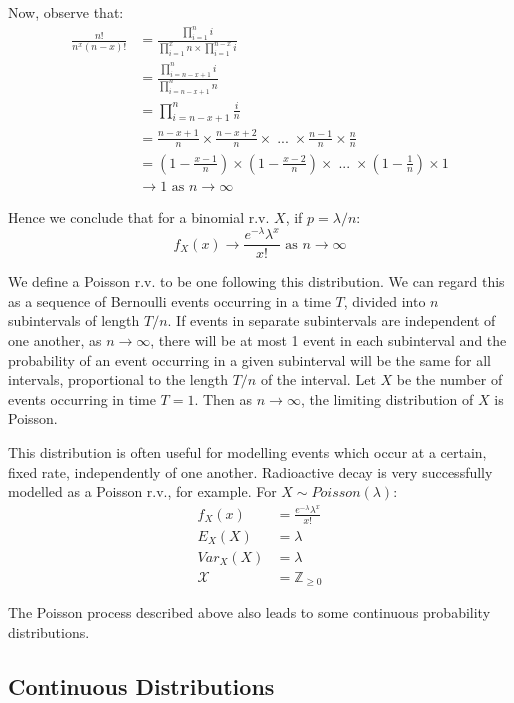 \documentclass[12pt,a4paper]{article}
\begin{document}
Now, observe that:
\begin{align*}
\frac{n!}{n^x(n-x)!} &= \frac{\prod\limits_{i=1}^n\!\! i}{\prod\limits_{i=1}^x\!\! n \times \prod\limits_{i=1}^{n-x} \!\!i}\\
&= \frac{\prod\limits_{i=n-x+1}^n\!\! i}{\prod\limits_{i=n-x+1}^n \!\!n}\\
&= \prod\limits_{i=n-x+1}^n \!\!\frac{i}{n}\\
&= \frac{n-x+1}{n}\times\frac{n-x+2}{n}\times\; ... \; \times \frac{n-1}{n} \times \frac{n}{n}\\
&= \left(1 - \frac{x-1}{n}\right) \times \left(1 - \frac{x-2}{n}\right)\times \; ...\; \times \left(1 - \frac{1}{n}\right) \times 1\\
&\rightarrow 1 \text{ as } n \rightarrow \infty
\end{align*}

Hence we conclude that for a binomial r.v. $X$, if $p = \lambda/n$:
$$f_X(x) \rightarrow \frac{e^{-\lambda}\lambda^x}{x!} \text{ as } n \rightarrow \infty$$

We define a Poisson r.v. to be one following this distribution. We can regard this as a sequence of Bernoulli events occurring in a time $T$, divided into $n$ subintervals of length $T/n$. If events in separate subintervals are independent of one another, as $n \rightarrow \infty$, there will be at most 1 event in each subinterval and the probability of an event occurring in a given subinterval will be the same for all intervals, proportional to the length $T/n$ of the interval. Let $X$ be the number of events occurring in time $T=1$. Then as $n \rightarrow \infty$, the limiting distribution of $X$ is Poisson.

This distribution is often useful for modelling events which occur at a certain, fixed rate, independently of one another. Radioactive decay is very successfully modelled as a Poisson r.v., for example. For $X \sim Poisson(\lambda)$:
\begin{align*}
f_X(x) &= \frac{e^{-\lambda}\lambda^x}{x!}\\
E_{X}(X) &= \lambda\\
Var_{X}(X) &= \lambda\\
\mathcal{X} &= \mathbb{Z}_{\geq 0}
\end{align*}

The Poisson process described above also leads to some continuous probability distributions.

\subsection{Continuous Distributions}
\end{document}
